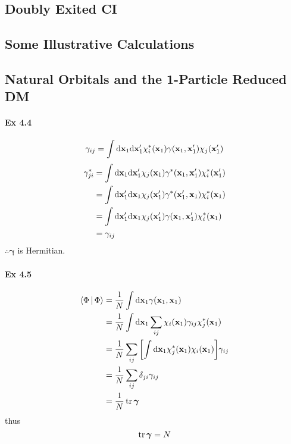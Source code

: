 \documentclass[a4paper]{article}
\newcommand{\ex}[1]{\paragraph{Ex #1}}
\numberwithin{equation}{subsection}
\begin{document}
\subsection{Doubly Exited CI}

\subsection{Some Illustrative Calculations}

\subsection{Natural Orbitals and the 1-Particle Reduced DM}
\ex{4.4}
\begin{equation}\label{key}
\gamma_{ij} = \int\dd\vb{x}_1\dd\vb{x}'_1 \chi_i^*(\vb{x}_1) \gamma(\vb{x}_1,\vb{x}'_1) \chi_j(\vb{x}'_1)
\end{equation}
\begin{align}
\gamma_{ji}^* &= \int\dd\vb{x}_1\dd\vb{x}'_1 \chi_j(\vb{x}_1) \gamma^*(\vb{x}_1,\vb{x}'_1) \chi_i^*(\vb{x}'_1) \notag\\
&= \int\dd\vb{x}'_1\dd\vb{x}_1 \chi_j(\vb{x}'_1) \gamma^*(\vb{x}'_1,\vb{x}_1) \chi_i^*(\vb{x}_1) \notag\\
&= \int\dd\vb{x}'_1\dd\vb{x}_1 \chi_j(\vb{x}'_1) \gamma(\vb{x}_1,\vb{x}'_1) \chi_i^*(\vb{x}_1) \notag\\
&= \gamma_{ij}
\end{align}
$ \therefore \bm\gamma$ is Hermitian.

\ex{4.5}
\begin{align}
\Braket{\Phi | \Phi} 
&= \dfrac{1}{N} \int\dd\vb{x}_1  \gamma(\vb{x}_1,\vb{x}_1) \notag\\
&= \dfrac{1}{N} \int\dd\vb{x}_1  \sum_{ij} \chi_i(\vb{x}_1) \gamma_{ij} \chi_j^*(\vb{x}_1) \notag\\
&= \dfrac{1}{N} \sum_{ij} \qty[\int\dd\vb{x}_1 \chi_j^*(\vb{x}_1) \chi_i(\vb{x}_1)] \gamma_{ij}  \notag\\
&= \dfrac{1}{N} \sum_{ij} \delta_{ji} \gamma_{ij} \notag\\
&= \dfrac{1}{N} \tr \bm\gamma
\end{align}
thus
\begin{equation}\label{key}
\tr \bm\gamma = N
\end{equation}
\end{document}

